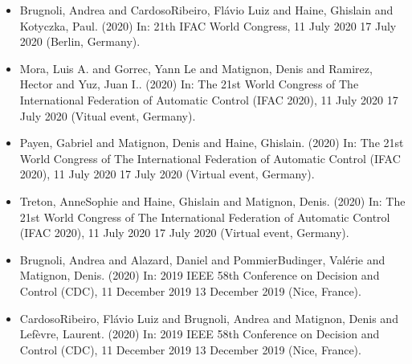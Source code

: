\documentclass[letterpaper,10pt,english]{sphinxmanual}
\begin{document}
\begin{itemize}
\item {} 
\sphinxAtStartPar
Brugnoli, Andrea and Cardoso\sphinxhyphen{}Ribeiro, Flávio Luiz and Haine, Ghislain and Kotyczka, Paul.  (2020) In: 21th IFAC World Congress, 11 July 2020 \sphinxhyphen{} 17 July 2020 (Berlin, Germany).

\item {} 
\sphinxAtStartPar
Mora, Luis A. and Gorrec, Yann Le and Matignon, Denis and Ramirez, Hector and Yuz, Juan I..  (2020) In: The 21st World Congress of The International Federation of Automatic Control (IFAC 2020), 11 July 2020 \sphinxhyphen{} 17 July 2020 (Vitual event, Germany).

\item {} 
\sphinxAtStartPar
Payen, Gabriel and Matignon, Denis and Haine, Ghislain.  (2020) In: The 21st World Congress of The International Federation of Automatic Control (IFAC 2020), 11 July 2020 \sphinxhyphen{} 17 July 2020 (Virtual event, Germany).

\item {} 
\sphinxAtStartPar
Treton, Anne\sphinxhyphen{}Sophie and Haine, Ghislain and Matignon, Denis.  (2020) In: The 21st World Congress of The International Federation of Automatic Control (IFAC 2020), 11 July 2020 \sphinxhyphen{} 17 July 2020 (Virtual event, Germany).

\item {} 
\sphinxAtStartPar
Brugnoli, Andrea and Alazard, Daniel and Pommier\sphinxhyphen{}Budinger, Valérie and Matignon, Denis.  (2020) In: 2019 IEEE 58th Conference on Decision and Control (CDC), 11 December 2019 \sphinxhyphen{} 13 December 2019 (Nice, France).

\item {} 
\sphinxAtStartPar
Cardoso\sphinxhyphen{}Ribeiro, Flávio Luiz and Brugnoli, Andrea and Matignon, Denis and Lefèvre, Laurent.  (2020) In: 2019 IEEE 58th Conference on Decision and Control (CDC), 11 December 2019 \sphinxhyphen{} 13 December 2019 (Nice, France).


\end{itemize}
\end{document}

